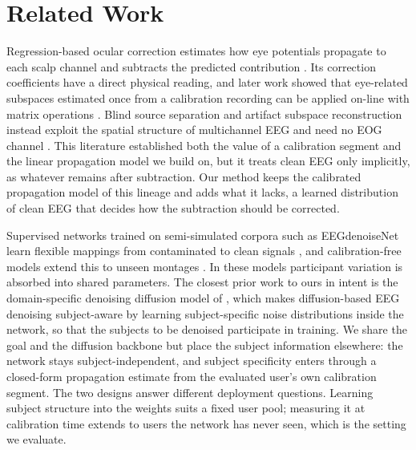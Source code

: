 \section{Related Work}
\label{sec:related-work}

Regression-based ocular correction estimates how eye potentials propagate to each scalp channel and subtracts the predicted contribution \cite{gratton1983ocular,semlitsch1986ocular}. Its correction coefficients have a direct physical reading, and later work showed that eye-related subspaces estimated once from a calibration recording can be applied on-line with matrix operations \cite{kobler2020sgeyesub}. Blind source separation and artifact subspace reconstruction instead exploit the spatial structure of multichannel EEG and need no EOG channel \cite{jung2000bss,chang2020asr}. This literature established both the value of a calibration segment and the linear propagation model we build on, but it treats clean EEG only implicitly, as whatever remains after subtraction. Our method keeps the calibrated propagation model of this lineage and adds what it lacks, a learned distribution of clean EEG that decides how the subtraction should be corrected.

Supervised networks trained on semi-simulated corpora such as EEGdenoiseNet learn flexible mappings from contaminated to clean signals \cite{zhang2021eegdenoisenet,sun2020rescnn,yu2022deepseparator,chuang2022icunet,lai2024cleegn}, and calibration-free models extend this to unseen montages \cite{marcosmartinez2025eegoarnet}. In these models participant variation is absorbed into shared parameters. The closest prior work to ours in intent is the domain-specific denoising diffusion model of \citet{duan2023dsddpm}, which makes diffusion-based EEG denoising subject-aware by learning subject-specific noise distributions inside the network, so that the subjects to be denoised participate in training. We share the goal and the diffusion backbone but place the subject information elsewhere: the network stays subject-independent, and subject specificity enters through a closed-form propagation estimate from the evaluated user's own calibration segment. The two designs answer different deployment questions. Learning subject structure into the weights suits a fixed user pool; measuring it at calibration time extends to users the network has never seen, which is the setting we evaluate.


